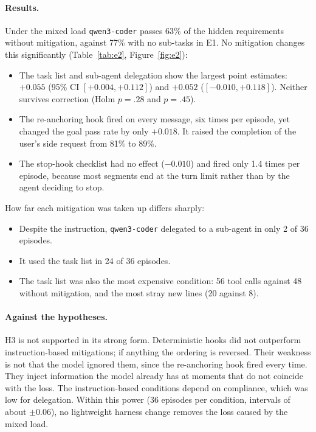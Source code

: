 \paragraph{Results.} Under the mixed load \texttt{qwen3-coder} passes 63\% of the hidden requirements
without mitigation, against 77\% with no sub-tasks in E1. No mitigation changes this significantly
(Table~\ref{tab:e2}, Figure~\ref{fig:e2}):
\begin{itemize}
  \item The task list and sub-agent delegation show the largest point estimates: $+0.055$
        (95\% CI $[+0.004, +0.112]$) and $+0.052$ ($[-0.010, +0.118]$). Neither survives correction
        (Holm $p=.28$ and $p=.45$).
  \item The re-anchoring hook fired on every message, six times per episode, yet changed the goal
        pass rate by only $+0.018$. It raised the completion of the user's side request from 81\% to
        89\%.
  \item The stop-hook checklist had no effect ($-0.010$) and fired only 1.4 times per episode,
        because most segments end at the turn limit rather than by the agent deciding to stop.
\end{itemize}
How far each mitigation was taken up differs sharply:
\begin{itemize}
  \item Despite the instruction, \texttt{qwen3-coder} delegated to a sub-agent in only 2 of 36
        episodes.
  \item It used the task list in 24 of 36 episodes.
  \item The task list was also the most expensive condition: 56 tool calls against 48 without
        mitigation, and the most stray new lines (20 against 8).
\end{itemize}

\paragraph{Against the hypotheses.} H3 is not supported in its strong form. Deterministic hooks did
not outperform instruction-based mitigations; if anything the ordering is reversed. Their weakness
is not that the model ignored them, since the re-anchoring hook fired every time. They inject
information the model already has at moments that do not coincide with the loss. The
instruction-based conditions depend on compliance, which was low for delegation. Within this power
(36 episodes per condition, intervals of about $\pm 0.06$), no lightweight harness change removes
the loss caused by the mixed load.

